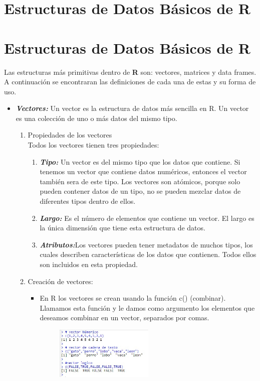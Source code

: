 \documentclass{article}
\begin{document}
\section{Estructuras de Datos Básicos de R}
\section{Estructuras de Datos Básicos de R}
Las estructuras más primitivas dentro de \textbf{R} son:  vectores, matrices y data frames.\\
A continuación se encontraran las definiciones de cada una de estas y su forma de uso.  
\begin{itemize}
\item \textbf{\textit{Vectores: }}
Un vector es la estructura de datos más sencilla en R. Un vector es una colección de uno o más datos del mismo tipo.
\begin{enumerate}
    \item Propiedades de los vectores\\
    Todos los vectores tienen tres propiedades:
    \begin{enumerate}
        \item \textbf{\textit{Tipo:}} Un vector es del mismo tipo que los datos que contiene. Si tenemos un vector que contiene datos numéricos, entonces el vector  también sera de este tipo. Los vectores son atómicos, porque solo pueden contener datos de un  tipo, no se pueden mezclar datos de diferentes tipos dentro de ellos.
       \item \textbf{\textit{Largo:}} Es el número de elementos que contiene un vector. El largo es la única dimensión que tiene esta estructura de datos.
      \item \textbf{\textit{Atributos:}}Los vectores pueden tener metadatos de muchos tipos, los cuales describen características de los datos que contienen. Todos ellos son incluidos en esta propiedad. 
    \end{enumerate}
    \item  Creación de vectores:
    \begin{itemize}
        \item En R los vectores se crean usando la función c() (combinar).
         Llamamos esta función y le damos como argumento los elementos que deseamos combinar en un vector, separados por comas.
         \begin{figure}[H]
            \centering
            \includegraphics[width=0.5\textwidth]{imagenes/ejemplo1.jpg}

\end{figure}
\end{itemize}
\end{enumerate}
\end{itemize}
\end{document}
